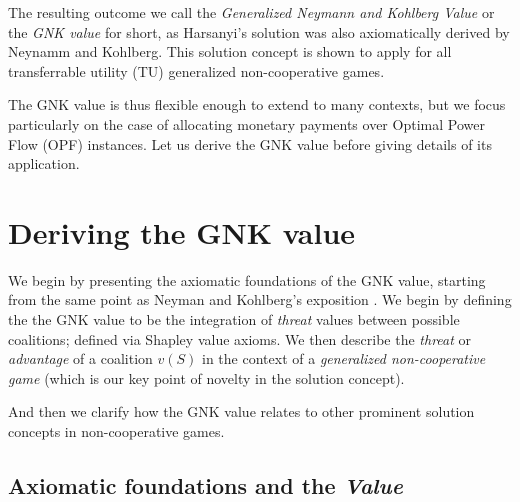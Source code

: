 The resulting outcome we call the \textit{Generalized Neymann and Kohlberg Value} or the \textit{GNK value} for short, 
as Harsanyi's solution was also axiomatically derived by Neynamm and Kohlberg.\cite{value2,KOHLBERG2018139}
This solution concept is shown to apply for all transferrable utility (TU) generalized non-cooperative games.

The GNK value is thus flexible enough to extend to many contexts, but we focus particularly on the case of allocating monetary payments over Optimal Power Flow (OPF) instances.
Let us derive the GNK value before giving details of its application.

\section{Deriving the GNK value}\label{the_value_def2}

We begin by presenting the axiomatic foundations of the GNK value, starting from the same point as Neyman and Kohlberg's exposition \cite{value2}.
We begin by defining the the GNK value to be the integration of \emph{threat} values between possible coalitions; defined via Shapley value axioms.
We then describe the \emph{threat} or \emph{advantage} of a coalition $v(S)$ in the context of a \textit{generalized non-cooperative game} (which is our key point of novelty in the solution concept).

And then we clarify how the GNK value relates to other prominent solution concepts in non-cooperative games.

\subsection{Axiomatic foundations and the \textit{Value}}\label{the_value_def}


